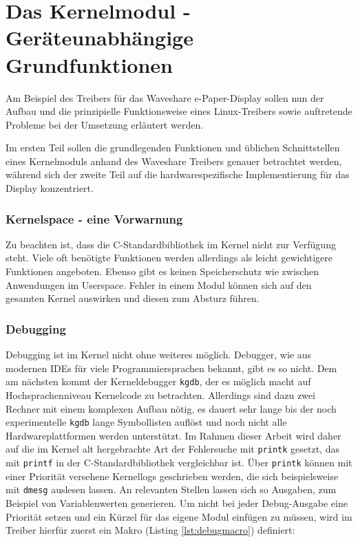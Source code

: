 
\chapter{Das Kernelmodul - Geräteunabhängige Grundfunktionen} 
Am Beispiel des Treibers für das Waveshare e-Paper-Display sollen nun der Aufbau und die prinzipielle Funktionsweise eines Linux-Treibers sowie auftretende Probleme bei der Umsetzung erläutert werden. 

Im ersten Teil sollen die grundlegenden Funktionen und üblichen Schnittstellen eines Kernelmoduls anhand des Waveshare Treibers genauer betrachtet werden, während sich der zweite Teil auf die hardwarespezifische Implementierung für das Display konzentriert.


\subsection{Kernelspace - eine Vorwarnung}
Zu beachten ist, dass die C-Standardbibliothek im Kernel nicht zur Verfügung steht. Viele oft benötigte Funktionen werden allerdings als leicht gewichtigere Funktionen angeboten. Ebenso gibt es keinen Speicherschutz wie zwischen Anwendungen im Userspace. Fehler in einem Modul können sich auf den gesamten Kernel auswirken und diesen zum Absturz führen. 

\subsection{Debugging}
Debugging ist im Kernel nicht ohne weiteres möglich. Debugger, wie aus modernen IDEs für viele Programmiersprachen bekannt, gibt es so nicht. Dem am nächsten kommt der Kerneldebugger \texttt{kgdb}, der es möglich macht auf Hochsprachenniveau Kernelcode zu betrachten. Allerdings sind dazu zwei Rechner mit einem komplexen Aufbau nötig, es dauert sehr lange bis der noch experimentelle \texttt{kgdb} lange Symbollisten auflöst und noch nicht alle Hardwareplattformen werden unterstützt. %
Im Rahmen dieser Arbeit wird daher auf die im Kernel alt hergebrachte Art der Fehlersuche mit \texttt{printk} gesetzt, das mit \texttt{printf} in der C-Standardbibliothek vergleichbar ist. Über \texttt{printk} können mit einer Priorität versehene Kernellogs geschrieben werden, die sich beispielsweise mit \texttt{dmesg} auslesen lassen. An relevanten Stellen lassen sich so Ausgaben, zum Beispiel von Variablenwerten generieren. Um nicht bei jeder Debug-Ausgabe eine Priorität setzen und ein Kürzel für das eigene Modul einfügen zu müssen, wird im Treiber hierfür zuerst ein Makro (Listing \ref{lst:debugmacro}) definiert:

